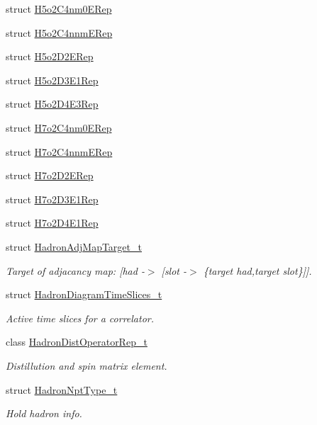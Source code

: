 \begin{DoxyCompactItemize}
struct \mbox{\hyperlink{structHadron_1_1H5o2C4nm0ERep}{H5o2\+C4nm0\+E\+Rep}}
\item 
struct \mbox{\hyperlink{structHadron_1_1H5o2C4nnmERep}{H5o2\+C4nnm\+E\+Rep}}
\item 
struct \mbox{\hyperlink{structHadron_1_1H5o2D2ERep}{H5o2\+D2\+E\+Rep}}
\item 
struct \mbox{\hyperlink{structHadron_1_1H5o2D3E1Rep}{H5o2\+D3\+E1\+Rep}}
\item 
struct \mbox{\hyperlink{structHadron_1_1H5o2D4E3Rep}{H5o2\+D4\+E3\+Rep}}
\item 
struct \mbox{\hyperlink{structHadron_1_1H7o2C4nm0ERep}{H7o2\+C4nm0\+E\+Rep}}
\item 
struct \mbox{\hyperlink{structHadron_1_1H7o2C4nnmERep}{H7o2\+C4nnm\+E\+Rep}}
\item 
struct \mbox{\hyperlink{structHadron_1_1H7o2D2ERep}{H7o2\+D2\+E\+Rep}}
\item 
struct \mbox{\hyperlink{structHadron_1_1H7o2D3E1Rep}{H7o2\+D3\+E1\+Rep}}
\item 
struct \mbox{\hyperlink{structHadron_1_1H7o2D4E1Rep}{H7o2\+D4\+E1\+Rep}}
\item 
struct \mbox{\hyperlink{structHadron_1_1HadronAdjMapTarget__t}{Hadron\+Adj\+Map\+Target\+\_\+t}}
\begin{DoxyCompactList}\small\item\em Target of adjacancy map\+: \mbox{[}had -\/$>$ \mbox{[}slot -\/$>$ \{target had,target slot\}\mbox{]}\mbox{]}. \end{DoxyCompactList}\item 
struct \mbox{\hyperlink{structHadron_1_1HadronDiagramTimeSlices__t}{Hadron\+Diagram\+Time\+Slices\+\_\+t}}
\begin{DoxyCompactList}\small\item\em Active time slices for a correlator. \end{DoxyCompactList}\item 
class \mbox{\hyperlink{classHadron_1_1HadronDistOperatorRep__t}{Hadron\+Dist\+Operator\+Rep\+\_\+t}}
\begin{DoxyCompactList}\small\item\em Distillution and spin matrix element. \end{DoxyCompactList}\item 
struct \mbox{\hyperlink{structHadron_1_1HadronNptType__t}{Hadron\+Npt\+Type\+\_\+t}}
\begin{DoxyCompactList}\small\item\em Hold hadron info. \end{DoxyCompactList}\item 

\end{DoxyCompactItemize}
